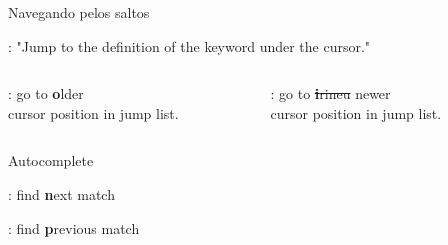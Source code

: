 \begin{frame}{Navegando pelos saltos}
    \begin{widedescription}
        \item \key{\sk{C-]}}: "Jump to the definition of the keyword under the cursor."
    \end{widedescription}

    \vfill
    
    \begin{columns}
        \begin{column}{0.5\linewidth}
            \begin{widedescription}
                \item {}: go to \textbf{o}lder \\ cursor position in jump list.
            \end{widedescription}
        \end{column}
        \begin{column}{0.5\linewidth}
            \begin{widedescription}
                \item {}: go to \sout{\textbf{i}rineu} newer \\ cursor position in jump list.
            \end{widedescription}
        \end{column}
    \end{columns}
\end{frame}

\begin{frame}{Autocomplete}
    \begin{widedescription}
        \item {}: find \textbf{n}ext match
        \item {}: find \textbf{p}revious match
    \end{widedescription}
\end{frame}